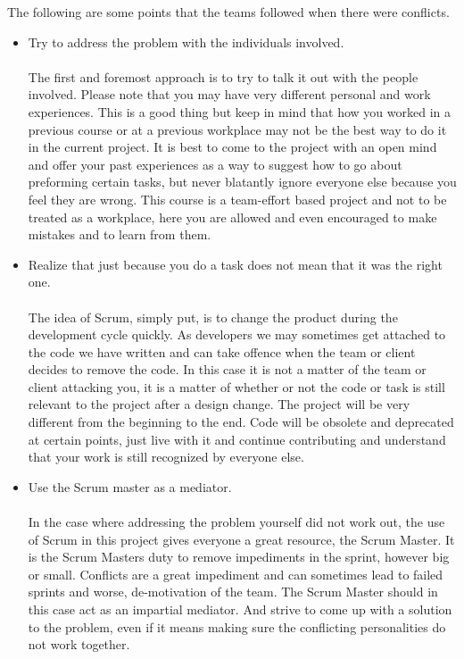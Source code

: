 The following are some points that the teams followed when there were conflicts.
\begin{itemize}
\item Try to address the problem with the individuals involved.\\ \\
The first and foremost approach is to try to talk it out with the people involved. Please note that you may have very different personal and work experiences. This is a good thing but keep in mind that how you worked in a previous course or at a previous workplace may not be the best way to do it in the current project. It is best to come to the project with an open mind and offer your past experiences as a way to suggest how to go about preforming certain tasks, but never blatantly ignore everyone else because you feel they are wrong. This course is a team-effort based project and not to be treated as a workplace, here you are allowed and even encouraged to make mistakes and to learn from them.

\item Realize that just because you do a task does not mean that it was the right one.\\ \\
The idea of Scrum, simply put, is to change the product during the development cycle quickly. As developers we may sometimes get attached to the code we have written and can take offence when the team or client decides to remove the code. In this case it is not a matter of the team or client attacking you, it is a matter of whether or not the code or task is still relevant to the project after a design change. The project will be very different from the beginning to the end. Code will be obsolete and deprecated at certain points, just live with it and continue contributing and understand that your work is still recognized by everyone else.
 \\
\item Use the Scrum master as a mediator.\\ \\
In the case where addressing the problem yourself did not work out, the use of Scrum in this project gives everyone a great resource, the Scrum Master. It is the Scrum Masters duty to remove impediments in the sprint, however big or small. Conflicts are a great impediment and can sometimes lead to failed sprints and worse, de-motivation of the team. The Scrum Master should in this case act as an impartial mediator. And strive to come up with a solution to the problem, even if it means making sure the conflicting personalities do not work together.

\end{itemize}
